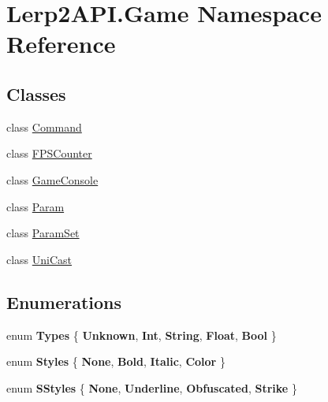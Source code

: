 \hypertarget{namespace_lerp2_a_p_i_1_1_game}{}\section{Lerp2\+A\+P\+I.\+Game Namespace Reference}
\label{namespace_lerp2_a_p_i_1_1_game}
\subsection*{Classes}
\begin{DoxyCompactItemize}
\item 
class \hyperlink{class_lerp2_a_p_i_1_1_game_1_1_command}{Command}
\item 
class \hyperlink{class_lerp2_a_p_i_1_1_game_1_1_f_p_s_counter}{F\+P\+S\+Counter}
\item 
class \hyperlink{class_lerp2_a_p_i_1_1_game_1_1_game_console}{Game\+Console}
\item 
class \hyperlink{class_lerp2_a_p_i_1_1_game_1_1_param}{Param}
\item 
class \hyperlink{class_lerp2_a_p_i_1_1_game_1_1_param_set}{Param\+Set}
\item 
class \hyperlink{class_lerp2_a_p_i_1_1_game_1_1_uni_cast}{Uni\+Cast}
\end{DoxyCompactItemize}
\subsection*{Enumerations}
\begin{DoxyCompactItemize}
\item 
\mbox{\label{namespace_lerp2_a_p_i_1_1_game_a2f182da062f210cc43f341f6992ee293}} 
enum {\bfseries Types} \{ \newline
{\bfseries Unknown}, 
{\bfseries Int}, 
{\bfseries String}, 
{\bfseries Float}, 
\newline
{\bfseries Bool}
 \}
\item 
\mbox{\label{namespace_lerp2_a_p_i_1_1_game_a44d264926b1618bd77ec2c974e7113b7}} 
enum {\bfseries Styles} \{ {\bfseries None}, 
{\bfseries Bold}, 
{\bfseries Italic}, 
{\bfseries Color}
 \}
\item 
\mbox{\label{namespace_lerp2_a_p_i_1_1_game_a40a896b145d802bb883b777ab7413d7b}} 
enum {\bfseries S\+Styles} \{ {\bfseries None}, 
{\bfseries Underline}, 
{\bfseries Obfuscated}, 
{\bfseries Strike}
 \}
\end{DoxyCompactItemize}
